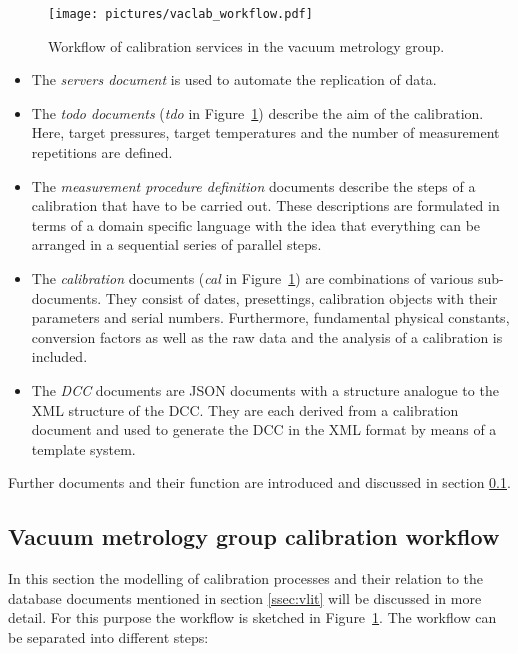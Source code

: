 \documentclass[3p,times,procedia]{elsarticle}
\begin{document}
\begin{figure}
    \centering
    \texttt{[image: pictures/vaclab\_workflow.pdf]}
    \caption{Workflow of calibration services in the vacuum metrology group. }
    \label{fig:vl-work}
\end{figure}

\begin{itemize}
  \item The \emph{servers document} is used to automate the
    replication of data.
  \item The \emph{todo documents} (\emph{tdo} in
    Figure~\ref{fig:vl-work}) describe the aim of the
    calibration. Here, target pressures, target temperatures and the
    number of measurement repetitions are defined.
  \item The \emph{measurement procedure definition} documents describe
    the steps of a calibration that have to be carried out. These
    descriptions are formulated in terms of a domain specific language
    with the idea that everything can be arranged in a sequential
    series of parallel steps.
  \item The \emph{calibration} documents (\emph{cal} in
    Figure~\ref{fig:vl-work}) are combinations of various
    sub-documents. They consist of dates, presettings, calibration
    objects with their parameters and serial numbers. Furthermore,
    fundamental physical constants, conversion factors as well as the raw data and
    the analysis of a calibration
    is included.
    \item The \emph{DCC} documents are JSON documents with a structure
      analogue to the XML structure of the DCC. They are each derived
      from a calibration document and used to generate the DCC in the
      XML format by means of a template system.
\end{itemize}

Further documents and their function are introduced and discussed in
section \ref{ssec:vl-work}.

\subsection{Vacuum metrology group calibration workflow}
\label{ssec:vl-work}

In this section the modelling of calibration processes and their relation
to the database documents mentioned in section \ref{ssec:vlit} will be
discussed in more detail.  For this purpose the workflow is sketched
in Figure~\ref{fig:vl-work}. The workflow can be separated into different steps:
\end{document}
